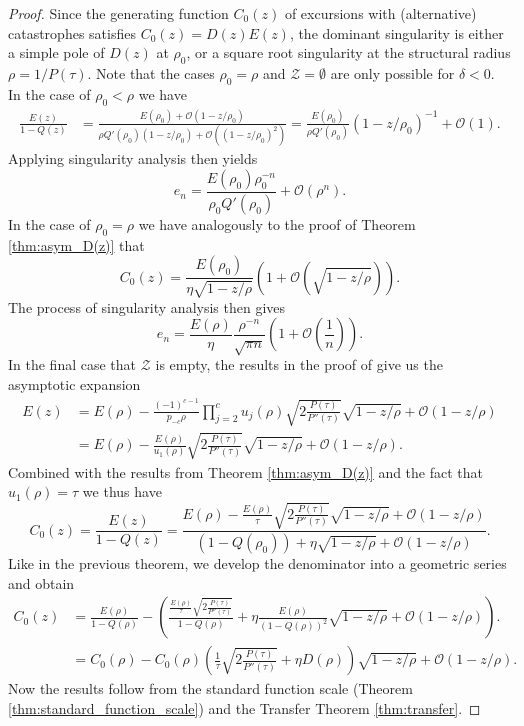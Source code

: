\begin{proof}
  Since the generating function $C_0(z)$ of excursions with (alternative) catastrophes satisfies $C_0(z) = D(z)E(z)$, the dominant singularity is either a simple pole of $D(z)$ at $\rho_0$, or a square root singularity at the structural radius $\rho = 1/P(\tau)$. Note that the cases $\rho_0 = \rho$ and $\mathcal{Z} = \emptyset$ are only possible for $\delta < 0$. In the case of $\rho_{0} < \rho$ we have
  \begin{align*}
    \frac{E(z)}{1-Q(z)} &= \frac{E(\rho_{0}) + \mathcal{O}\left(1 - z/\rho_{0}\right)}{\rho Q'(\rho_{0})\left(1- z/\rho_{0}\right) + \mathcal{O}\left(\left(1-z/\rho_{0}\right)^{2}\right)} 
    = \frac{E(\rho_{0})}{\rho Q'(\rho_{0})}\left(1- z/\rho_{0}\right)^{-1} + \mathcal{O}(1).
  \end{align*}
  Applying singularity analysis then yields
  $$
    e_{n} = \frac{E(\rho_{0})\rho_{0}^{-n}}{\rho_{0}Q'(\rho_{0})} + \mathcal{O}(\rho^{n}).
  $$
  In the case of $\rho_{0}= \rho$ we have analogously to the proof of Theorem \ref{thm:asym_D(z)} that
  $$
    C_0(z) = \frac{E(\rho_{0})}{\eta\sqrt{1- z/\rho}}\left(1 + \mathcal{O}\left(\sqrt{1 - z/\rho}\right)\right).
  $$
  The process of singularity analysis then gives
  $$
    e_{n} = \frac{E(\rho)}{\eta}\frac{\rho^{-n}}{\sqrt{\pi n}}\left(1 + \mathcal{O}\left(\frac{1}{n}\right)\right).
  $$
  In the final case that $\mathcal{Z}$ is empty, the results in the proof of \cite[Theorem 3]{Basic} give us the asymptotic expansion
  \begin{align*}
    E(z) &= E(\rho) - \frac{(-1)^{c-1}}{p_{-c}\rho} \prod_{j=2}^c u_j(\rho)\sqrt{2\frac{P(\tau)}{P''(\tau)}}\sqrt{1 - z/\rho} + \mathcal{O}(1 - z/\rho) \\
    &= E(\rho) - \frac{E(\rho)}{u_1(\rho)}\sqrt{2\frac{P(\tau)}{P''(\tau)}}\sqrt{1 - z/\rho} + \mathcal{O}(1 - z/\rho).
  \end{align*}
  Combined with the results from Theorem \ref{thm:asym_D(z)} and the fact that $u_1(\rho) = \tau$ we thus have
  $$
  C_0(z) = \frac{E(z)}{1 - Q(z)} = \frac{E(\rho) - \frac{E(\rho)}{\tau}\sqrt{2\frac{P(\tau)}{P''(\tau)}}\sqrt{1 - z/\rho} + \mathcal{O}(1 - z/\rho)}{(1 - Q(\rho_0)) + \eta\sqrt{1 - z/\rho} + \mathcal{O}(1 - z/\rho)}.
  $$
  Like in the previous theorem, we develop the denominator into a geometric series and obtain
  \begin{align*}
    C_0(z) &= \frac{E(\rho)}{1 - Q(\rho)} - 
    \left(
      \frac{
          \frac{E(\rho)}{\tau}\sqrt{2\frac{P(\tau)}{P''(\tau)}}}
          {1 - Q(\rho)
        } + 
        \eta \frac{E(\rho)}{(1 - Q(\rho))^2}\sqrt{1 - z/\rho} + 
        \mathcal{O}(1 - z/\rho)
    \right). \\
    &= C_0(\rho) - C_0(\rho)\left(
      \frac{1}{\tau}\sqrt{2\frac{P(\tau)}{P''(\tau)}} + \eta D(\rho)
      \right)\sqrt{1 - z/\rho} + \mathcal{O}(1 - z/\rho).
  \end{align*}
  Now the results follow from the standard function scale (Theorem \ref{thm:standard_function_scale}) and the Transfer Theorem \ref{thm:transfer}.
\end{proof}

